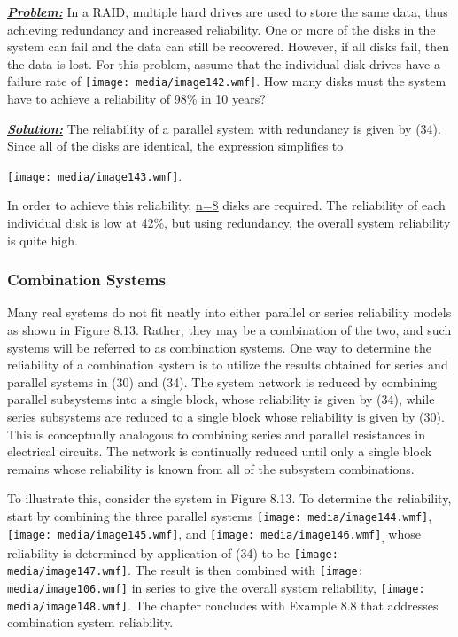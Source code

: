 \emph{\textbf{\ul{Problem:}}} In a RAID, multiple hard drives are used
to store the same data, thus achieving redundancy and increased
reliability. One or more of the disks in the system can fail and the
data can still be recovered. However, if all disks fail, then the data
is lost. For this problem, assume that the individual disk drives have a
failure rate of \texttt{[image: media/image142.wmf]}. How many disks
must the system have to achieve a reliability of 98\% in 10 years?

\emph{\textbf{\ul{Solution:}}} The reliability of a parallel system with
redundancy is given by (34). Since all of the disks are identical, the
expression simplifies to

\texttt{[image: media/image143.wmf]}.

In order to achieve this reliability, \ul{n=8} disks are required. The
reliability of each individual disk is low at 42\%, but using
redundancy, the overall system reliability is quite high.

\subsubsection{Combination Systems}\label{combination-systems}

Many real systems do not fit neatly into either parallel or series
reliability models as shown in Figure 8.13. Rather, they may be a
combination of the two, and such systems will be referred to as
combination systems. One way to determine the reliability of a
combination system is to utilize the results obtained for series and
parallel systems in (30) and (34). The system network is reduced by
combining parallel subsystems into a single block, whose reliability is
given by (34), while series subsystems are reduced to a single block
whose reliability is given by (30). This is conceptually analogous to
combining series and parallel resistances in electrical circuits. The
network is continually reduced until only a single block remains whose
reliability is known from all of the subsystem combinations.

To illustrate this, consider the system in Figure 8.13. To determine the
reliability, start by combining the three parallel systems
\texttt{[image: media/image144.wmf]},
\texttt{[image: media/image145.wmf]}, and
\texttt{[image: media/image146.wmf]}\textsubscript{,} whose reliability
is determined by application of (34) to be
\texttt{[image: media/image147.wmf]}. The result is then combined with
\texttt{[image: media/image106.wmf]} in series to give the overall
system reliability, \texttt{[image: media/image148.wmf]}. The chapter
concludes with Example 8.8 that addresses combination system
reliability.

